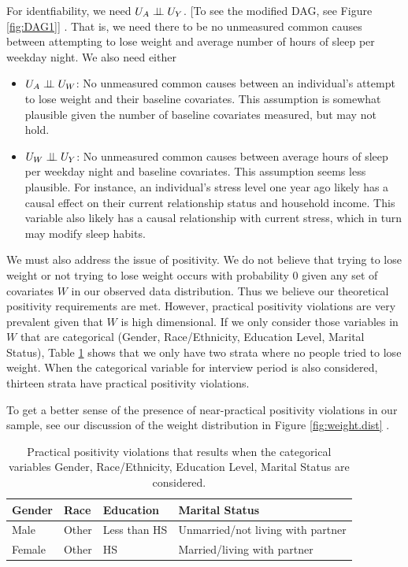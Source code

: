 \documentclass{article}
\begin{document}
For identfiability, we need $U_{A} \perp\hspace{-5pt}\perp U_{Y}$. [To see the modified DAG, see Figure \ref{fig:DAG1}] .  That is, we need there to be no unmeasured common causes between attempting to lose weight and average number of hours of sleep per weekday night. We also need either 
    \begin{itemize}
      \item $U_{A} \perp\hspace{-5pt}\perp U_{W}$: No unmeasured common causes between an individual's attempt to lose weight and their baseline covariates. This assumption is somewhat plausible given the number of baseline covariates measured, but may not hold.
      \item $U_{W} \perp\hspace{-5pt}\perp U_{Y}$: No unmeasured common causes between average hours of sleep per weekday night and baseline covariates. This assumption seems less plausible. For instance, an individual's stress level one year ago likely has a causal effect on their current relationship status and household income. This variable also likely has a causal relationship with current stress, which in turn may modify sleep habits.
    \end{itemize}

We must also address the issue of positivity.  We do not believe that trying to lose weight or not trying to lose weight occurs with probability $0$ given any set of covariates $W$ in our observed data distribution.  Thus we believe our theoretical positivity requirements are met.  However, practical positivity violations are very prevalent given that $W$ is high dimensional.  If we only consider those variables in $W$ that are categorical (Gender, Race/Ethnicity, Education Level, Marital Status), Table \ref{tab:prac.pos}  shows that we only have two strata where no people tried to lose weight. When the categorical variable for interview period is also considered, thirteen strata have practical positivity violations.

To get a better sense of the presence of near-practical positivity violations in our sample, see our discussion of the weight distribution in Figure \ref{fig:weight.dist} .

\begin{table}[ht]
\centering
\begin{tabular}{| l | l | l | l |}
\hline
 Gender & Race & Education & Marital Status \\
\hline
Male & Other & Less than HS & Unmarried/not living with partner \\
Female & Other & HS & Married/living with partner \\
\hline
\end{tabular}
\caption{Practical positivity violations that results when the categorical variables Gender, Race/Ethnicity, Education Level, Marital Status are considered.}
\label{tab:prac.pos}
\end{table}
\end{document}
